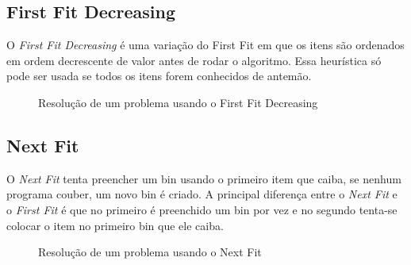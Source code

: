 \subsection{First Fit Decreasing}

O \textit{First Fit Decreasing} é uma variação do First Fit em que os itens são ordenados em ordem decrescente
de valor antes de rodar o algoritmo. Essa heurística só pode ser usada se todos os itens forem conhecidos de
antemão.

\begin{figure}[H]
  \centering
  \caption{Resolução de um problema usando o First Fit Decreasing}
\end{figure}

\subsection{Next Fit}

O \textit{Next Fit} tenta preencher um bin usando o primeiro item que caiba, se nenhum programa couber, um
novo bin é criado. A principal diferença entre o \textit{Next Fit} e o \textit{First Fit} é que no primeiro
é preenchido um bin por vez e no segundo tenta-se colocar o item no primeiro bin que ele caiba.

\begin{figure}[H]
  \centering
  \caption{Resolução de um problema usando o Next Fit}
\end{figure}

